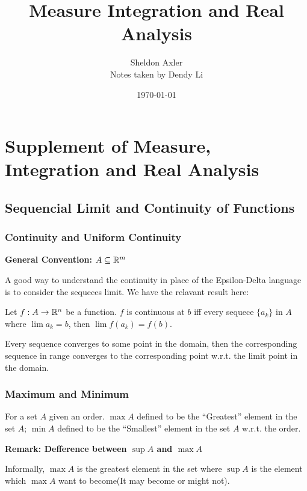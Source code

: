 \documentclass[11pt]{article}
\author{Sheldon Axler \\
Notes taken by Dendy Li}
\date{\today}
\title{\elzevier Measure Integration and Real Analysis}
\begin{document}
\maketitle
\tableofcontents

\section{Supplement of Measure, Integration and Real Analysis}
\label{sec:org46e16f4}

\subsection{Sequencial Limit and Continuity of Functions}
\label{sec:orgbcb1daf}
\subsubsection{Continuity and Uniform Continuity}
\label{sec:org69cc042}
\textbf{General Convention: \(A \subseteq \mathbb{R}^m\)}

A good way to understand the continuity in place of the Epsilon-Delta language is to consider the sequeces limit. We have the relavant result here:

\begin{proposition}
Let \(f: A \to \mathbb{R}^n\) be a function. \(f\) is continuous at \(b\) iff every sequece \(\{a_k\}\) in \(A\) where \(\lim a_k = b\), then \(\lim f(a_k) = f(b)\).
\end{proposition}

Every sequence converges to some point in the domain, then the corresponding sequence in range converges to the corresponding point w.r.t. the limit point in the domain.
\subsubsection{Maximum and Minimum}
\label{sec:org3fb5d02}
\begin{definition}
For a set \(A\) given an order. \(\max A\) defined to be the ``Greatest'' element in the set \(A\); \(\min A\) defined to be the ``Smallest'' element in the set \(A\) w.r.t. the order.
\end{definition}

\textbf{Remark: Defference between \(\sup A\) and \(\max A\)}

Informally, \(\max A\) is the greatest element in the set where \(\sup A\) is the element which \(\max A\) want to become(It may become or might not).
\end{document}
